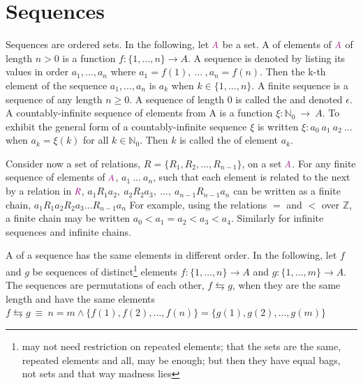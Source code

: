 \section{Sequences}\label{sec:sequences}

\pn Sequences are ordered sets. In the following, let $\mc{A}$ be a set.  A  of elements of $\mc{A}$ of length $n>0$ is a function
\(f:\{1,\ldots,n\} \rightarrow A\).  
A sequence is denoted by listing its values in order
\(a_1,\ldots,a_n\)
where $a_1=f(1),~\ldots~, a_n=f(n)$.  Then the k-th element of the sequence $a_1,\ldots,a_n$ is $a_k$ when 
$k\in\{1,\ldots,n\}$.  A finite sequence is a sequence of any length $n\ge0$.
A sequence of length 0 is called the  and denoted $\epsilon$.
A countably-infinite sequence of elements from A is a function $\xi:\mathbb{N}_0~\rightarrow~A$.
To exhibit the general form of a countably-infinite sequence $\xi$ is written
\(\xi:a_0~a_1~a_2~\ldots\)
when $a_k=\xi(k)$ for all $k\in\mathbb{N}_0$.  Then $k$ is called the  of element $a_k$.


\pn Consider now a set of relations, $R=\{R_1,R_2,\ldots,R_{n-1}\}$, on a set $\mc{A}$.  For any finite sequence of elements of $\mc{A}$, 
$a_1~\ldots~a_n$, such that each element is related to the next by a relation in $\mc{R}$,
\(a_1 R_1 a_2,~a_2 R_2 a_3,~\ldots,~a_{n-1} R_{n-1} a_n\)
can be written as a finite chain,
\(a_1 R_1 a_2 R_2 a_3 \ldots R_{n-1} a_n\)
For example, using the relations $=$ and $<$ over $\mathbb{Z}$, a finite chain may be written
\(a_0<a_1=a_2<a_3<a_4\).  
Similarly for infinite sequences and infinite chains.

\pn A  of a sequence has the same elements in different order.  In the following, let $f$ and $g$ be sequences of distinct\footnote{may not need restriction on repeated elements; that the sets are the same, repeated elements and all, may be enough; but then they have equal bags, not sets and that way madness lies} elements
\(f:\{1,\ldots,n\} \rightarrow A\) and \(g:\{1,\ldots,m\} \rightarrow A\).  
The sequences are permutations of each other, $f \leftrightarrows g$, when they are the same length and have the same elements
\(f\leftrightarrows g~\equiv~n=m\land \{f(1),f(2),\ldots,f(n)\}=\{g(1),g(2),\ldots,g(m)\}\)



